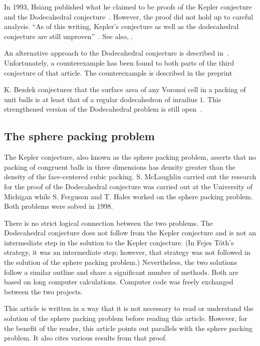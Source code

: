 \documentclass{article} %
\begin{document}
In 1993, Hsiang published what he claimed to be proofs of the Kepler
conjecture and the Dodecahedral conjecture~\cite{Hsiang:1993:IJM}.
However, the proof did not hold up to careful analysis.  ``As of this
writing, Kepler's conjecture as well as the dodecahedral conjecture
are still unproven''~\cite[p761]{Bezdek:1997:IJM}.  See also, \cite{Hales:1994:MI}.

An alternative approach to the Dodecahedral conjecture is described
in~\cite{Bezdek:1997:IJM}.  Unfortunately, a counterexample has been found to
both parts of the third conjecture of that article.  The counterexample
is described in the preprint~\cite{Hales:2002:Dodec}

K. Bezdek conjectures that the surface area of any Voronoi cell in a packing
of unit balls is at least that of a regular dodecahedron of inradius $1$.
This strengthened version of the Dodecahedral problem is still
open~\cite{Bezdek:2004:WSP}.

\subsection{The sphere packing problem}

The Kepler conjecture, also known as the sphere packing problem,
asserts that no packing of congruent balls in three dimensions has
density greater than the density of the face-centered cubic packing.
S. McLaughlin carried out the research for the proof of the
Dodecahedral conjecture was carried out at the University of Michigan
while S. Ferguson and T. Hales worked on the sphere packing problem.
Both problems were solved in 1998.

There is no strict logical connection between the two problems. The
Dodecahedral conjecture does not follow from the Kepler conjecture and
is not an intermediate step in the solution to the Kepler conjecture.
(In Fejes T\'oth's strategy, it was an intermediate step; however,
that strategy was not followed in the solution of the sphere packing
problem.) Nevertheless, the two solutions follow a similar outline and
share a significant number of methods. Both are based on long computer
calculations. Computer code was freely exchanged between the two
projects.

This article is written in a way that it is not necessary to read or
understand the solution of the sphere packing problem before reading
this article. However, for the benefit of the reader, this article
points out parallels with the sphere packing problem. It also cites
various results from that proof.
\end{document}
